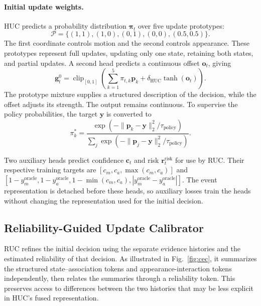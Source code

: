 \documentclass[a4paper,fleqn]{cas-sc}
\newcommand{\gbase}{\bm{g}_t^{0}}
\begin{document}
\paragraph{Initial update weights.}
HUC predicts a probability distribution $\bm{\pi}_t$ over five update prototypes:
\begin{equation}
\mathcal{P}=\{(1,1),(1,0),(0,1),(0,0),(0.5,0.5)\}.
\label{eq:policy_set}
\end{equation}
The first coordinate controls motion and the second controls appearance. These prototypes represent full updates, updating only one state, retaining both states, and partial updates. A second head predicts a continuous offset $\bm{o}_t$, giving
\begin{equation}
\gbase=\operatorname{clip}_{[0,1]}\!\left(
\sum_{k=1}^{5}\pi_{t,k}\bm{p}_k+
\delta_{\mathrm{HUC}}\tanh(\bm{o}_t)
\right).
\label{eq:cue_gate}
\end{equation}
The prototype mixture supplies a structured description of the decision, while the offset adjusts its strength. The output remains continuous. To supervise the policy probabilities, the target $\bm{y}$ is converted to
\begin{equation}
\pi_k^*=
\frac{\exp(-\|\bm{p}_k-\bm{y}\|_2^2/\tau_{\mathrm{policy}})}
{\sum_j\exp(-\|\bm{p}_j-\bm{y}\|_2^2/\tau_{\mathrm{policy}})}.
\label{eq:policy_target}
\end{equation}

Two auxiliary heads predict confidence $\bm{c}_t$ and risk $\bm{r}_t^{\mathrm{risk}}$ for use by RUC. Their respective training targets are $[c_m,c_a,\max(c_m,c_a)]$ and $[1-y_m^{\mathrm{oracle}},1-y_a^{\mathrm{oracle}},1-\min(c_m,c_a),|y_m^{\mathrm{oracle}}-y_a^{\mathrm{oracle}}|]$. The event representation is detached before these heads, so auxiliary losses train the heads without changing the representation used for the initial decision.

\subsection{Reliability-Guided Update Calibrator}
RUC refines the initial decision using the separate evidence histories and the estimated reliability of that decision. As illustrated in Fig.~\ref{fig:cec}, it summarizes the structured state--association tokens and appearance-interaction tokens independently, then relates the summaries through a reliability token. This preserves access to differences between the two histories that may be less explicit in HUC's fused representation.
\end{document}
